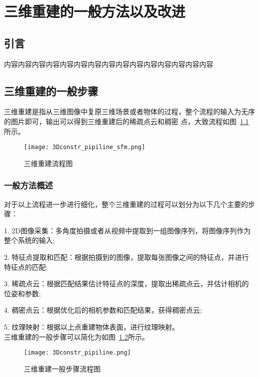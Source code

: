 \chapter{三维重建的一般方法以及改进}
\label{cha:chap3}
\section{引言}
\label{sec:3.1}
内容内容内容内容内容内容内容内容内容内容内容内容内容内容内容
\section{三维重建的一般步骤}
\label{sec:3.2}
三维重建是指从三维图像中复原三维场景或者物体的过程，整个流程的输入为无序的图片即可，输出可以得到三维重建后的稀疏点云和稠密
点，大致流程如图~\ref{fig:3Dconstr_pipiline_sfm}所示。
\begin{figure}[H] %
    \centering
    \texttt{[image: 3Dconstr\_pipiline\_sfm.png]}
    \caption{三维重建流程图}
    \label{fig:3Dconstr_pipiline_sfm}
    \end{figure}
\subsection{一般方法概述}
\label{sec:3.2.1}
对于以上流程进一步进行细化，整个三维重建的过程可以划分为以下几个主要的步骤：

1.  2D图像采集：多角度拍摄或者从视频中提取到一组图像序列，将图像序列作为整个系统的输入;

2.  特征点提取和匹配：根据拍摄到的图像，提取每张图像之间的特征点，并进行特征点的匹配;

3.  稀疏点云：根据匹配结果估计特征点的深度，提取出稀疏点云，并估计相机的位姿和参数;

4.  稠密点云：根据优化后的相机参数和匹配结果，获得稠密点云;

5.  纹理映射：根据以上点重建物体表面，进行纹理映射。\\
三维重建的一般步骤可以简化为如图~\ref{fig:3Dconstr_pipiline}所示。
\begin{figure}[H] %
    \centering
    \texttt{[image: 3Dconstr\_pipiline.png]}
    \caption{三维重建一般步骤流程图}
    \label{fig:3Dconstr_pipiline}
    \end{figure}

